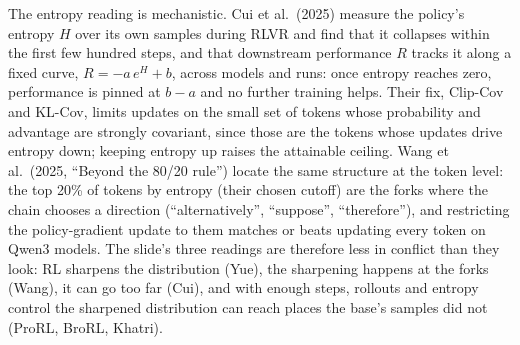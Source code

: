 \documentclass[11pt,letterpaper]{article}
\begin{document}
The entropy reading is mechanistic. Cui et al.\ (2025) measure the policy's entropy $H$ over its own samples during RLVR and find that it collapses within the first few hundred steps, and that downstream performance $R$ tracks it along a fixed curve, $R=-a\,e^{H}+b$, across models and runs: once entropy reaches zero, performance is pinned at $b-a$ and no further training helps. Their fix, Clip-Cov and KL-Cov, limits updates on the small set of tokens whose probability and advantage are strongly covariant, since those are the tokens whose updates drive entropy down; keeping entropy up raises the attainable ceiling. Wang et al.\ (2025, ``Beyond the 80/20 rule'') locate the same structure at the token level: the top 20\% of tokens by entropy (their chosen cutoff) are the forks where the chain chooses a direction (``alternatively'', ``suppose'', ``therefore''), and restricting the policy-gradient update to them matches or beats updating every token on Qwen3 models. The slide's three readings are therefore less in conflict than they look: RL sharpens the distribution (Yue), the sharpening happens at the forks (Wang), it can go too far (Cui), and with enough steps, rollouts and entropy control the sharpened distribution can reach places the base's samples did not (ProRL, BroRL, Khatri).
\end{document}
